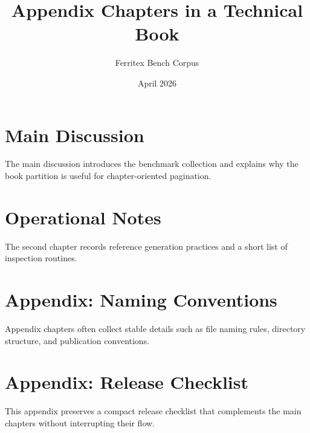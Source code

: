 \documentclass{book}
\title{Appendix Chapters in a Technical Book}
\author{Ferritex Bench Corpus}
\date{April 2026}
\begin{document}
\maketitle
\tableofcontents

\chapter{Main Discussion}
The main discussion introduces the benchmark collection and explains why the
book partition is useful for chapter-oriented pagination.

\chapter{Operational Notes}
The second chapter records reference generation practices and a short list of
inspection routines.

\appendix
\chapter{Appendix: Naming Conventions}
Appendix chapters often collect stable details such as file naming rules,
directory structure, and publication conventions.

\chapter{Appendix: Release Checklist}
This appendix preserves a compact release checklist that complements the main
chapters without interrupting their flow.
\end{document}
